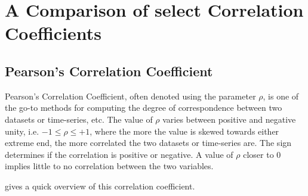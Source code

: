 \section{A Comparison of select Correlation Coefficients}

\subsection*{Pearson's Correlation Coefficient}

Pearson's Correlation Coefficient, often denoted using the parameter $\rho$, is one of the go-to methods for computing the degree of correspondence between two datasets or time-series, etc. The value of $\rho$ varies between positive and negative unity, i.e. $-1 \leq \rho \leq +1$, where the more the value is skewed towards either extreme end, the more correlated the two datasets or time-series are. The sign determines if the correlation is positive or negative. A value of $\rho$ closer to $0$ implies little to no correlation between the two variables.

 gives a quick overview of this correlation coefficient.

